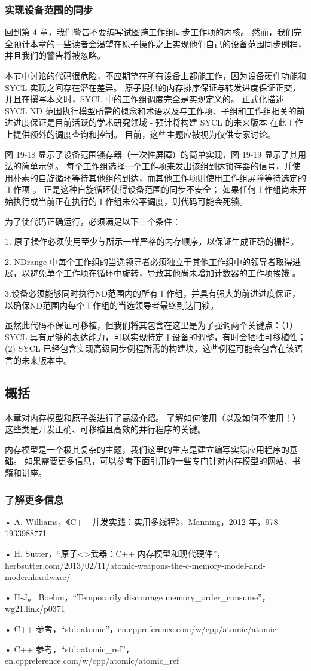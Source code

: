 \subsubsection{实现设备范围的同步}
回到第 4 章，我们警告不要编写试图跨工作组同步工作项的内核。 然而，我们完全预计本章的一些读者会渴望在原子操作之上实现他们自己的设备范围同步例程，并且我们的警告将被忽略。

本节中讨论的代码很危险，不应期望在所有设备上都能工作，因为设备硬件功能和 SYCL 实现之间存在潜在差异。 原子提供的内存排序保证与转发进度保证正交，并且在撰写本文时，SYCL 中的工作组调度完全是实现定义的。 正式化描述 SYCL ND 范围执行模型所需的概念和术语以及与工作项、子组和工作组相关的前进进度保证是目前活跃的学术研究领域 - 预计将构建 SYCL 的未来版本 在此工作上提供额外的调度查询和控制。 目前，这些主题应被视为仅供专家讨论。

图 19-18 显示了设备范围锁存器（一次性屏障）的简单实现，图 19-19 显示了其用法的简单示例。 每个工作组选择一个工作项来发出该组到达锁存器的信号，并使用朴素的自旋循环等待其他组的到达，而其他工作项则使用工作组屏障等待选定的工作项 。 正是这种自旋循环使得设备范围的同步不安全； 如果任何工作组尚未开始执行或当前正在执行的工作组未公平调度，则代码可能会死锁。

为了使代码正确运行，必须满足以下三个条件：

1. 原子操作必须使用至少与所示一样严格的内存顺序，以保证生成正确的栅栏。

2. NDrange 中每个工作组的当选领导者必须独立于其他工作组中的领导者取得进展，以避免单个工作项在循环中旋转，导致其他尚未增加计数器的工作项挨饿 。

3.设备必须能够同时执行ND范围内的所有工作组，并具有强大的前进进度保证，以确保ND范围内每个工作组的当选领导者最终到达闩锁。

虽然此代码不保证可移植，但我们将其包含在这里是为了强调两个关键点：（1）SYCL 具有足够的表达能力，可以实现特定于设备的调整，有时会牺牲可移植性； (2) SYCL 已经包含实现高级同步例程所需的构建块，这些例程可能会包含在该语言的未来版本中。

\subsection{概括}
本章对内存模型和原子类进行了高级介绍。 了解如何使用（以及如何不使用！）这些类是开发正确、可移植且高效的并行程序的关键。

内存模型是一个极其复杂的主题，我们这里的重点是建立编写实际应用程序的基础。 如果需要更多信息，可以参考下面引用的一些专门针对内存模型的网站、书籍和讲座。

\subsubsection{了解更多信息}
• A. Williams，《C++ 并发实践：实用多线程》，Manning，2012 年，978-1933988771

• H. Sutter，“原子<>武器：C++ 内存模型和现代硬件”，herbsutter.com/2013/02/11/atomic-weapons-the-c-memory-model-and-modernhardware/

• H-J。 Boehm，“Temporarily discourage memory\_order\_consume”，wg21.link/p0371

• C++ 参考，“std::atomic”，en.cppreference.com/w/cpp/atomic/atomic

• C++ 参考，“std::atomic\_ref”，en.cppreference.com/w/cpp/atomic/atomic\_ref